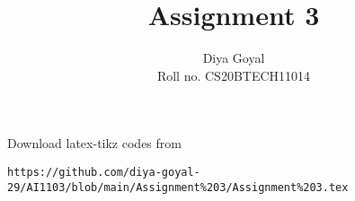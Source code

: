 \documentclass[journal,12pt,twocolumn]{IEEEtran}
\theoremstyle{definition}
\DeclareMathOperator*{\Res}{Res}
\begin{document}
\newcommand{\BEQA}{\begin{eqnarray}}
\newcommand{\EEQA}{\end{eqnarray}}
\newcommand{\define}{\stackrel{\triangle}{=}}

\raggedbottom
\setlength{\parindent}{0pt}
\providecommand{\mbf}{\mathbf}
\providecommand{\pr}[1]{\ensuremath{\Pr\left(#1\right)}}
\providecommand{\qfunc}[1]{\ensuremath{Q\left(#1\right)}}
\providecommand{\sbrak}[1]{\ensuremath{{}\left[#1\right]}}
\providecommand{\lsbrak}[1]{\ensuremath{{}\left[#1\right.}}
\providecommand{\rsbrak}[1]{\ensuremath{{}\left.#1\right]}}
\providecommand{\brak}[1]{\ensuremath{\left(#1\right)}}
\providecommand{\lbrak}[1]{\ensuremath{\left(#1\right.}}
\providecommand{\rbrak}[1]{\ensuremath{\left.#1\right)}}
\providecommand{\cbrak}[1]{\ensuremath{\left\{#1\right\}}}
\providecommand{\lcbrak}[1]{\ensuremath{\left\{#1\right.}}
\providecommand{\rcbrak}[1]{\ensuremath{\left.#1\right\}}}
\theoremstyle{remark}
\newtheorem{rem}{Remark}
\newcommand{\sgn}{\mathop{\mathrm{sgn}}}
\providecommand{\abs}[1]{\vert#1\vert}
\providecommand{\res}[1]{\Res\displaylimits_{#1}} 
\providecommand{\norm}[1]{\lVert#1\rVert}
\providecommand{\mtx}[1]{\mathbf{#1}}
\providecommand{\mean}[1]{E[ #1 ]}
\providecommand{\fourier}{\overset{\mathcal{F}}{ \rightleftharpoons}}
\providecommand{\system}{\overset{\mathcal{H}}{ \longleftrightarrow}}
\newcommand{\solution}{\noindent \textbf{Solution: }}
\newcommand{\cosec}{\,\text{cosec}\,}
\providecommand{\dec}[2]{\ensuremath{\overset{#1}{\underset{#2}{\gtrless}}}}
\newcommand{\myvec}[1]{\ensuremath{\begin{pmatrix}#1\end{pmatrix}}}
\newcommand{\mydet}[1]{\ensuremath{\begin{vmatrix}#1\end{vmatrix}}}
\makeatletter
{}
\makeatother
\let\StandardTheFigure\thefigure
\let\vec\mathbf
\renewcommand{\thefigure}{\theproblem}
\def\putbox#1#2#3{\makebox[0in][l]{\makebox[#1][l]{}\raisebox{\baselineskip}[0in][0in]{\raisebox{#2}[0in][0in]{#3}}}}
     \def\rightbox#1{\makebox[0in][r]{#1}}
     \def\centbox#1{\makebox[0in]{#1}}
     \def\topbox#1{\raisebox{-\baselineskip}[0in][0in]{#1}}
     \def\midbox#1{\raisebox{-0.5\baselineskip}[0in][0in]{#1}}
\vspace{3cm}
\title{Assignment 3}
\author{Diya Goyal\\ Roll no. CS20BTECH11014}
\maketitle
\newpage
\bigskip
\renewcommand{\thefigure}{\theenumi}
\renewcommand{\thetable}{\theenumi}
Download latex-tikz codes from 
\begin{lstlisting}
https://github.com/diya-goyal-29/AI1103/blob/main/Assignment%203/Assignment%203.tex
\end{lstlisting}
\end{document}
